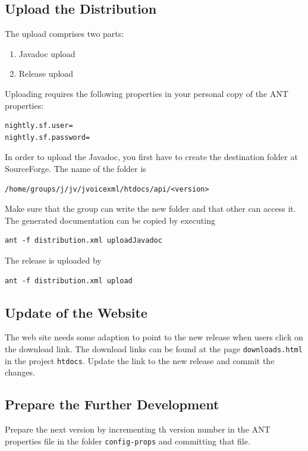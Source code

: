 \documentclass[11pt,a4paper]{article}
\begin{document}
\subsection{Upload the Distribution}

The upload comprises two parts:
\begin{enumerate}
  \item Javadoc upload
  \item Release upload
\end{enumerate}

Uploading requires the following properties in your personal copy of the ANT
properties:
\begin{lstlisting}
nightly.sf.user=
nightly.sf.password=
\end{lstlisting}

In order to upload the Javadoc, you first have to create the
destination folder at SourceForge. The name of the folder is
\begin{lstlisting}
/home/groups/j/jv/jvoicexml/htdocs/api/<version>
\end{lstlisting}
Make sure that the group can write the new folder and that other can access it.
The generated documentation can be copied by executing
\begin{lstlisting}
ant -f distribution.xml uploadJavadoc
\end{lstlisting}

The release is uploaded by 
\begin{lstlisting}
ant -f distribution.xml upload
\end{lstlisting}

\subsection{Update of the Website}

The web site needs some adaption to point to the new release when users click
on the download link. The download links can be found at the page
\texttt{downloads.html} in the project \texttt{htdocs}. Update the link
to the new release and commit the changes.

\subsection{Prepare the Further Development}

Prepare the next version by incrementing th version number in the ANT
properties file in the folder \texttt{config-props} and committing that file.
\end{document}
